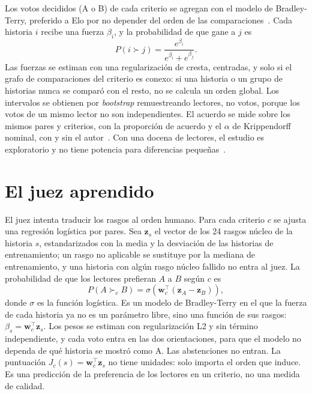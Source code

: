 Los votos decididos (A o B) de cada criterio se agregan con el modelo de Bradley-Terry, preferido a
Elo por no depender del orden de las comparaciones~\cite{boubdir2023,chiang2024}. Cada historia $i$
recibe una fuerza $\beta_i$, y la probabilidad de que gane a $j$ es
\begin{equation}
  P(i \succ j) = \frac{e^{\beta_i}}{e^{\beta_i} + e^{\beta_j}}.
\end{equation}
Las fuerzas se estiman con una regularización de cresta, centradas, y solo si el grafo de
comparaciones del criterio es conexo: si una historia o un grupo de historias nunca se comparó con
el resto, no se calcula un orden global. Los intervalos se obtienen por \textit{bootstrap}
remuestreando lectores, no votos, porque los votos de un mismo lector no son independientes. El
acuerdo se mide sobre los mismos pares y criterios, con la proporción de acuerdo y el $\alpha$ de
Krippendorff nominal, con y sin el autor~\cite{vanderlee2021}. Con una docena de lectores, el
estudio es exploratorio y no tiene potencia para diferencias pequeñas~\cite{card2020}.

\section{El juez aprendido}\label{sec:juez}

El juez intenta traducir los rasgos al orden humano. Para cada criterio $c$ se ajusta una regresión logística
por pares. Sea $\mathbf{z}_s$ el vector de los 24 rasgos núcleo de la historia $s$, estandarizados con
la media y la desviación de las historias de entrenamiento; un rasgo no aplicable se sustituye por
la mediana de entrenamiento, y una historia con algún rasgo núcleo fallido no entra al juez. La
probabilidad de que los lectores prefieran $A$ a $B$ según $c$ es
\begin{equation}
  P(A \succ_c B) = \sigma\!\left(\mathbf{w}_c^{\top}(\mathbf{z}_A - \mathbf{z}_B)\right),
\end{equation}
donde $\sigma$ es la función logística. Es un modelo de Bradley-Terry en el que la fuerza de cada
historia ya no es un parámetro libre, sino una función de sus rasgos: $\beta_s = \mathbf{w}_c^{\top}
\mathbf{z}_s$. Los pesos se estiman con regularización L2 y sin término independiente, y cada voto
entra en las dos orientaciones, para que el modelo no dependa de qué historia se mostró como A. Las
abstenciones no entran. La puntuación $J_c(s) = \mathbf{w}_c^{\top}\mathbf{z}_s$ no tiene unidades:
solo importa el orden que induce. Es una predicción de la preferencia de los lectores en un
criterio, no una medida de calidad.

